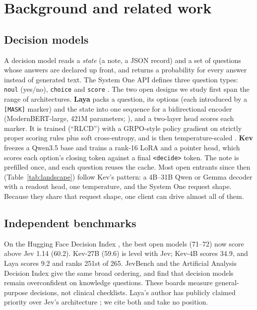 \documentclass[11pt]{article}
\begin{document}
\section{Background and related work}
\label{sec:related}

\subsection{Decision models}
A decision model reads a \emph{state} (a note, a JSON record) and a set of questions whose answers are declared up front, and returns a probability for every answer instead of generated text.
The System One API defines three question types: \texttt{noul} (yes/no), \texttt{choice} and \texttt{score} \citep{typesafe2026}.
The two open designs we study first span the range of architectures.
\textbf{Laya} \citep{laya2026} packs a question, its options (each introduced by a \texttt{[MASK]} marker) and the state into one sequence for a bidirectional encoder (ModernBERT-large, 421M parameters; \citealp{warner2024modernbert}), and a two-layer head scores each marker.
It is trained (``RLCD'') with a GRPO-style policy gradient \citep{shao2024grpo} on strictly proper scoring rules \citep{gneiting2007scoring} plus soft cross-entropy, and is then temperature-scaled \citep{guo2017calibration}.
\textbf{Kev} \citep{kev2026} freezes a Qwen3.5 base and trains a rank-16 LoRA \citep{hu2022lora} and a pointer head, which scores each option's closing token against a final \texttt{<decide>} token. The note is prefilled once, and each question reuses the cache.
Most open entrants since then (Table~\ref{tab:landscape}) follow Kev's pattern: a 4B--31B Qwen or Gemma decoder with a readout head, one temperature, and the System One request shape.
Because they share that request shape, one client can drive almost all of them.



\subsection{Independent benchmarks}
On the Hugging Face Decision Index \citep{decision_index}, the best open models (71--72) now score above Jev 1.14 (60.2).
Kev-27B (59.6) is level with Jev; Kev-4B scores 34.9, and Laya scores 9.2 and ranks 251st of 265.
JevBench \citep{jevbench} and the Artificial Analysis Decision Index \citep{aa_decision_index} give the same broad ordering, and find that decision models remain overconfident on knowledge questions.
These boards measure general-purpose decisions, not clinical checklists.
Laya's author has publicly claimed priority over Jev's architecture \citep{tomshw_dispute}; we cite both and take no position.
\end{document}
